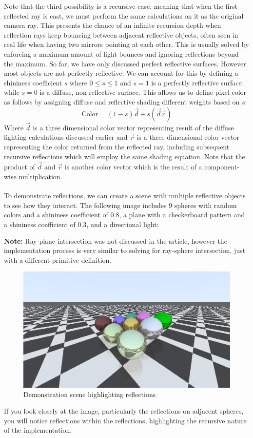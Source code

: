 Note that the third possibility is a recursive case, meaning that when the first reflected ray is cast, we must perform the same calculations on it as the original camera ray. This presents the chance of an infinite recursion depth when reflection rays keep bouncing between adjacent reflective objects, often seen in real life when having two mirrors pointing at each other. This is usually solved by enforcing a maximum amount of light bounces and ignoring reflections beyond the maximum. So far, we have only discussed perfect reflective surfaces. However most objects are not perfectly reflective. We can account for this by defining a shininess coefficient $s$ where $0 \leq s \leq 1$ and $s = 1$ is a perfectly reflective surface while $s = 0$ is a diffuse, non-reflective surface. This allows us to define pixel color as follows by assigning diffuse and reflective shading different weights based on $s$:
$$\text{Color} = (1-s)\Vec{d} + s(\Vec{d}\Vec{r})$$
Where $\Vec{d}$ is a three dimensional color vector representing result of the diffuse lighting calculations discussed earlier and $\Vec{r}$ is a three dimensional color vector representing the color returned from the reflected ray, including subsequent recursive reflections which will employ the same shading equation. Note that the product of $\Vec{d}$ and $\Vec{r}$ is another color vector which is the result of a component-wise multiplication.
\\
\\
\noindent
To demonstrate reflections, we can create a scene with multiple reflective objects to see how they interact. The following image includes 9 spheres with random colors and a shininess coefficient of 0.8, a plane with a checkerboard pattern and a shininess coefficient of 0.3, and a directional light:
\begin{tcolorbox}
\textbf{Note: }Ray-plane intersection was not discussed in the article, however the implementation process is very similar to solving for ray-sphere intersection, just with a different primitive definition.
\end{tcolorbox}
\begin{figure}[H]
    \centering
    \includegraphics[scale=0.6]{figures/ReflectionDemoScene.png}
    \caption{Demonstration scene highlighting reflections}
    \label{fig:reflect_demo}
\end{figure}
\noindent
If you look closely at the image, particularly the reflections on adjacent spheres, you will notice reflections within the reflections, highlighting the recursive nature of the implementation.